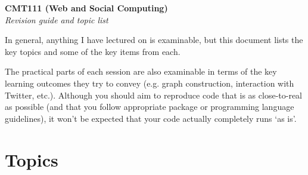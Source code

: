 \documentclass[11pt,a4paper]{report}
\begin{document}
\noindent\Large\textbf{CMT111 (Web and Social Computing)}\\
\noindent\large\textit{Revision guide and topic list}
\vskip30pt

In general, anything I have lectured on is examinable, but this document lists the key topics and some of the key items from each. 

The practical parts of each session are also examinable in terms of the key learning outcomes they try to convey (e.g. graph construction, interaction with Twitter, etc.). Although you should aim to reproduce code that is as close-to-real as possible (and that you follow appropriate package or programming language guidelines), it won't be expected that your code actually completely runs `as is'.

\section*{Topics}
\end{document}
